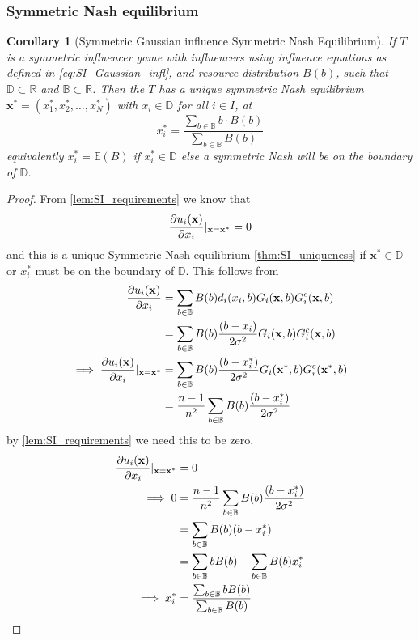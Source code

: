 \documentclass{article}
\newtheorem{corollary}{Corollary}[theorem]
\newcommand {\R}{\mathbb{R}}
\newcommand {\D}{\mathbb{D}}
\newcommand {\B}{\mathbb{B}}
\begin{document}
            \subsubsection{Symmetric Nash equilibrium}
            \begin{corollary}[Symmetric Gaussian influence Symmetric Nash Equilibrium]\label{cor:SI_stability_Gaussian}
                If $T$ is a symmetric influencer game with influencers using influence equations as defined in \cref{eq:SI_Gaussian_infl}, and resource distribution $B(b)$, such that $\D\subset \R$ and $\B\subset \R$. Then the $T$ has a unique symmetric Nash equilibrium $\mathbf{x}^*=(x_1^*,x_2^*,\dots,x_N^*)$ with $x_i\in \D$ for all $i\in I$, at 
                \begin{equation}
                    x_i^*=\frac{\sum_{b\in \B}b \cdot B(b) }{\sum_{b\in \B}B(b)}
                \end{equation}
                equivalently $x_i^*=\mathbb{E}(B)$ if $x_i^*\in \D$ else a symmetric Nash will be on the boundary of $\D$. 
            \end{corollary}
            \begin{proof}
                From \cref{lem:SI_requirements} we know that 
                \begin{equation}
                    \pdv{u_i(\mathbf{x})}{x_i}|_{\mathbf{x}=\mathbf{x^*}}=0
                \end{equation}
                and this is a unique Symmetric Nash equilibrium \cref{thm:SI_uniqueness} if $\mathbf{x}^*\in \D$ or $x_i^*$ must be on the boundary of $\mathbb{D}$. This follows from  
                \begin{align}
                     \pdv{u_i(\mathbf{x})}{x_{i}}&= \sum_{b\in \B} B(b)d_{i}(x_{i},b)G_i(\mathbf{x},b)G_i^c(\mathbf{x},b) \\ %
                     &= \sum_{b\in \B} B(b)\frac{(b-x_i)}{2\sigma^2}G_i(\mathbf{x},b)G_i^c(\mathbf{x},b) \\ %
                     \implies \pdv{u_i(\mathbf{x})}{x_{i}}|_{\mathbf{x}=\mathbf{x}^*}&=\sum_{b\in \B} B(b)\frac{(b-x_i^*)}{2\sigma^2}G_i(\mathbf{x}^*,b)G_i^c(\mathbf{x}^*,b) \\ %
                     &=\frac{n-1}{n^2}\sum_{b\in \B}B(b)\frac{(b-x_i^*)}{2\sigma^2}
                \end{align}
                by \cref{lem:SI_requirements} we need this to be zero. 
                \begin{align}
                    \pdv{u_i(\mathbf{x})}{x_{i}}|_{\mathbf{x}=\mathbf{x}^*}&=0 \\ %
                    \implies 0&=\frac{n-1}{n^2}\sum_{b\in \B}B(b)\frac{(b-x_i^*)}{2\sigma^2} \\ %
                    &=\sum_{b\in \B}B(b)(b-x_i^*) \\ %
                    &=\sum_{b\in \B}bB(b)-\sum_{b\in \B}B(b)x_i^* \\ %
                    \implies x_i^*&=\frac{\sum_{b\in \B} bB(b)}{\sum_{b\in \B}B(b)}
                \end{align}
            \end{proof}            
\end{document}
